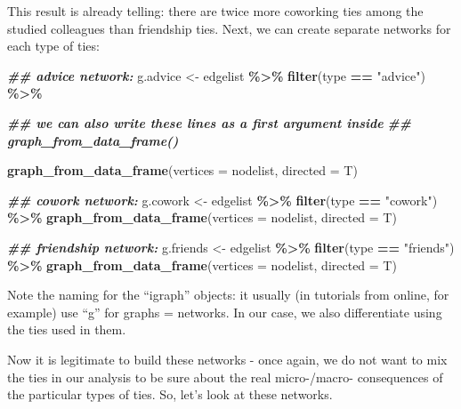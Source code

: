 \documentclass[
]{book}
\newenvironment{Shaded}{\begin{snugshade}}{\end{snugshade}}
\newcommand{\AttributeTok}[1]{\textcolor[rgb]{0.13,0.29,0.53}{#1}}
\newcommand{\DocumentationTok}[1]{\textcolor[rgb]{0.56,0.35,0.01}{\textbf{\textit{#1}}}}
\newcommand{\FunctionTok}[1]{\textcolor[rgb]{0.13,0.29,0.53}{\textbf{#1}}}
\newcommand{\NormalTok}[1]{#1}
\newcommand{\OtherTok}[1]{\textcolor[rgb]{0.56,0.35,0.01}{#1}}
\newcommand{\SpecialCharTok}[1]{\textcolor[rgb]{0.81,0.36,0.00}{\textbf{#1}}}
\newcommand{\StringTok}[1]{\textcolor[rgb]{0.31,0.60,0.02}{#1}}
\begin{document}
This result is already telling: there are twice more coworking ties among the studied colleagues than friendship ties. Next, we can create separate networks for each type of ties:

\begin{Shaded}
\begin{Highlighting}[]
\DocumentationTok{\#\# advice network:}
\NormalTok{g.advice }\OtherTok{\textless{}{-}}\NormalTok{ edgelist }\SpecialCharTok{\%\textgreater{}\%} 
  \FunctionTok{filter}\NormalTok{(type }\SpecialCharTok{==} \StringTok{"advice"}\NormalTok{) }\SpecialCharTok{\%\textgreater{}\%}
  
  \DocumentationTok{\#\# we can also write these lines as a first argument inside}
  \DocumentationTok{\#\# \textasciigrave{}graph\_from\_data\_frame()\textasciigrave{}}
  
  \FunctionTok{graph\_from\_data\_frame}\NormalTok{(}\AttributeTok{vertices =}\NormalTok{ nodelist,}
                        \AttributeTok{directed =}\NormalTok{ T)}

\DocumentationTok{\#\# cowork network:}
\NormalTok{g.cowork }\OtherTok{\textless{}{-}}\NormalTok{ edgelist }\SpecialCharTok{\%\textgreater{}\%} 
  \FunctionTok{filter}\NormalTok{(type }\SpecialCharTok{==} \StringTok{"cowork"}\NormalTok{) }\SpecialCharTok{\%\textgreater{}\%}
  \FunctionTok{graph\_from\_data\_frame}\NormalTok{(}\AttributeTok{vertices =}\NormalTok{ nodelist,}
                        \AttributeTok{directed =}\NormalTok{ T)}

\DocumentationTok{\#\# friendship network:}
\NormalTok{g.friends }\OtherTok{\textless{}{-}}\NormalTok{ edgelist }\SpecialCharTok{\%\textgreater{}\%} 
  \FunctionTok{filter}\NormalTok{(type }\SpecialCharTok{==} \StringTok{"friends"}\NormalTok{) }\SpecialCharTok{\%\textgreater{}\%}
  \FunctionTok{graph\_from\_data\_frame}\NormalTok{(}\AttributeTok{vertices =}\NormalTok{ nodelist,}
                        \AttributeTok{directed =}\NormalTok{ T)}
\end{Highlighting}
\end{Shaded}

Note the naming for the ``igraph'' objects: it usually (in tutorials from online, for example) use ``g'' for graphs = networks. In our case, we also differentiate using the ties used in them.

Now it is legitimate to build these networks - once again, we do not want to mix the ties in our analysis to be sure about the real micro-/macro- consequences of the particular types of ties. So, let's look at these networks.
\end{document}
